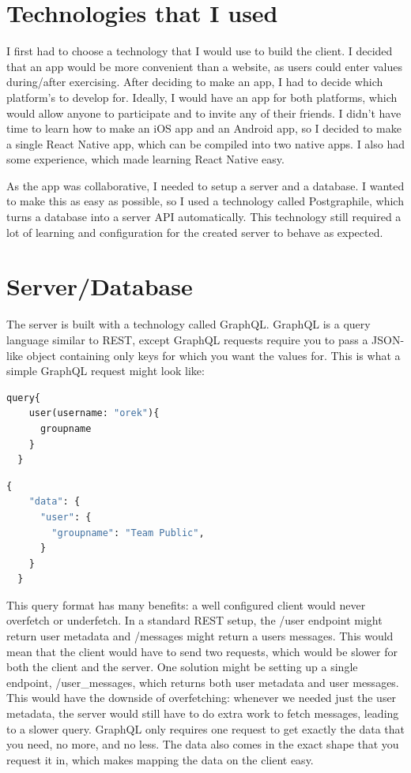 \documentclass{l4proj}
\begin{document}
\section{Technologies that I used}
I first had to choose a technology that I would use to build the client. I decided that an app would be more convenient than a website, as users could enter values during/after exercising. After deciding to make an app, I had to decide which platform's to develop for. Ideally, I would have an app for both platforms, which would allow anyone to participate and to invite any of their friends. I didn't have time to learn how to make an iOS app and an Android app, so I decided to make a single React Native app, which can be compiled into two native apps. I also had some experience, which made learning React Native easy.

As the app was collaborative, I needed to setup a server and a database. I wanted to make this as easy as possible, so I used a technology called Postgraphile, which turns a database into a server API automatically. This technology still required a lot of learning and configuration for the created server to behave as expected.

\section{Server/Database}

The server is built with a technology called GraphQL. GraphQL is a query language similar to REST, except GraphQL requests require you to pass a JSON-like object containing only keys for which you want the values for. This is what a simple GraphQL request might look like: 

\begin{lstlisting}[language=python, caption={An example GraphQL query fetching a user's group}, label=lst:callahan]
  query{
    user(username: "orek"){
      groupname
    }
  }
\end{lstlisting}

\begin{lstlisting}[language=python, caption={Response to above query}]
  {
    "data": {
      "user": {
        "groupname": "Team Public",
      }
    }
  }
\end{lstlisting}
This query format has many benefits: a well configured client would never overfetch or underfetch. In a standard REST setup, the /user endpoint might return user metadata and /messages might return a users messages. This would mean that the client would have to send two requests, which would be slower for both the client and the server. One solution might be setting up a single endpoint, /user\_messages, which returns both user metadata and user messages. This would have the downside of overfetching: whenever we needed just the user metadata, the server would still have to do extra work to fetch messages, leading to a slower query. GraphQL only requires one request to get exactly the data that you need, no more, and no less. The data also comes in the exact shape that you request it in, which makes mapping the data on the client easy. 
\end{document}

